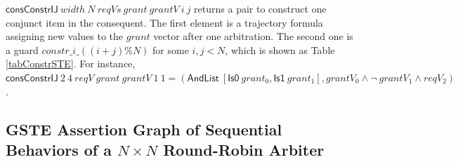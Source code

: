 \documentclass[final]{IEEEtran}
\begin{document}
 $\mathsf{consConstrIJ}\ width\ N\ reqVs\ grant\ grantV\ i\ j$
returns a pair to construct one conjunct  item in the consequent.
The first element is a trajectory formula assigning new values to
the $grant$ vector after one arbitration. The second one is a guard
$constr\_i\_{((i+j)\%N)}$ for some $i,j<N$, which is shown as Table
\ref{tabConstrSTE}. For instance, $\mathsf{consConstrIJ}\ 2\ 4\
reqV\ grant\ grantV\ 1\ 1=(\mathsf{AndList}\ [\mathsf{Is0}\
grant_0,\mathsf{Is1}\ grant_1], grantV_0\wedge \neg\ grantV_1 \wedge
reqV_2)$.



\subsection{GSTE Assertion Graph
of Sequential Behaviors of a $N \times N$ Round-Robin Arbiter }
\end{document}
